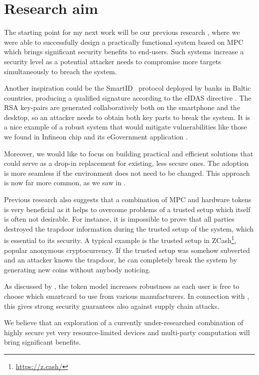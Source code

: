 \documentclass[
  digital, %
  twoside, %
  table,   %
  lof,     %
  lot,     %
]{fithesis3}
\newcounter{ph4_show_guides}
\theoremstyle{definition}
\theoremstyle{remark}
\begin{document}
\section{Research aim}
The starting point for my next work will be our previous research \cite{2017-ccs-mavroudis}, where we were able to successfully design a practically functional system based on MPC which brings significant security benefits to end-users. Such systems increase a security level as a potential attacker needs to compromise more targets simultaneously to breach the system. 

Another inspiration could be the SmartID~\cite{smart_id_ee} protocol deployed by banks in Baltic countries, producing a qualified signature according to the eIDAS directive \cite{eidas2016}. The RSA key-pairs are generated collaboratively both on the smartphone and the desktop, so an attacker needs to obtain both key parts to break the system. It is a nice example of a robust system that would mitigate vulnerabilities like those we found in Infineon chip and its eGovernment application \cite{2017-ccs-nemec}. 

Moreover, we would like to focus on building practical and efficient solutions that could serve as a drop-in replacement for existing, less secure ones. 
The adoption is more seamless if the environment does not need to be changed.
This approach is now far more common, as we saw in \cite{smart_id_ee, DCMBR18}. %

Previous research also suggests that a combination of MPC and hardware tokens is very beneficial as it helps to overcome problems of a trusted setup which  itself is often not desirable. For instance, it is impossible to prove that all parties destroyed the trapdoor information during the trusted setup of the system, which is essential to its security. A typical example is the trusted setup in ZCash\footnote{\url{https://z.cash/}}, popular anonymous cryptocurrency. If the trusted setup was somehow subverted and an attacker knows the trapdoor, he can completely break the system by generating new coins without anybody noticing.

As discussed by \cite{K07}, the token model increases robustness as each user is free to choose which smartcard to use from various manufacturers. In connection with \cite{2017-ccs-nemec}, this gives strong security guarantees also against supply chain attacks.

We believe that an exploration of a currently under-researched combination of highly secure yet very resource-limited devices and multi-party computation will bring significant benefits.
\end{document}
